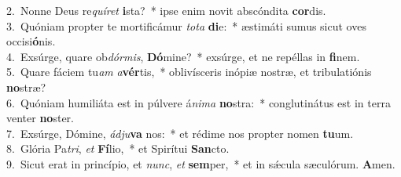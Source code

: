 {2.~}Nonne Deus re\textit{quí}\textit{ret} \textbf{i}sta?~* ipse enim novit abscóndita \textbf{cor}dis.\\
{3.~}Quóniam propter te mortificámur \textit{to}\textit{ta} \textbf{di}e:~* æstimáti sumus sicut oves occisi\textbf{ó}nis.\\
{4.~}Exsúrge, quare ob\textit{dór}\textit{mis}, \textbf{Dó}mine?~* exsúrge, et ne repéllas in \textbf{fi}nem.\\
{5.~}Quare fáciem tu\textit{am} \textit{a}\textbf{vér}tis,~* oblivísceris inópiæ nostræ, et tribulatiónis \textbf{no}stræ?\\
{6.~}Quóniam humiliáta est in púlvere á\textit{ni}\textit{ma} \textbf{no}stra:~* conglutinátus est in terra venter \textbf{no}ster.\\
{7.~}Exsúrge, Dómine, \textit{ád}\textit{ju}\textbf{va} nos:~* et rédime nos propter nomen \textbf{tu}um.\\
{8.~}Glória Pa\textit{tri}, \textit{et} \textbf{Fí}lio,~* et Spirítui \textbf{San}cto.\\
{9.~}Sicut erat in princípio, et \textit{nunc}, \textit{et} \textbf{sem}per,~* et in sǽcula sæculórum. \textbf{A}men.\\
